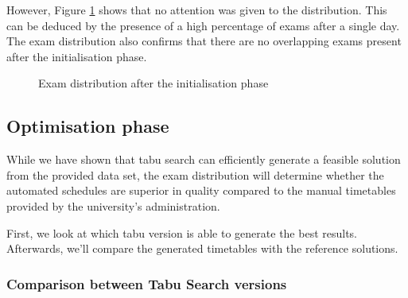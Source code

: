 However, Figure \ref{fig:init} shows that no attention was given to the distribution. This can be deduced by the presence of a high percentage of exams after a single day. The exam distribution also confirms that there are no overlapping exams present after the initialisation phase.

\begin{figure}[H]
  \centering
  \hfill
  \caption{Exam distribution after the initialisation phase}
  \label{fig:init}
\end{figure}

\subsection{Optimisation phase}

While we have shown that tabu search can efficiently generate a feasible solution from the provided data set, the exam distribution will determine whether the automated schedules are superior in quality compared to the manual timetables provided by the university's administration.

First, we look at which \acrlong{tabu} version is able to generate the best results. Afterwards, we'll compare the generated timetables with the reference solutions.

\subsubsection{Comparison between Tabu Search versions}

